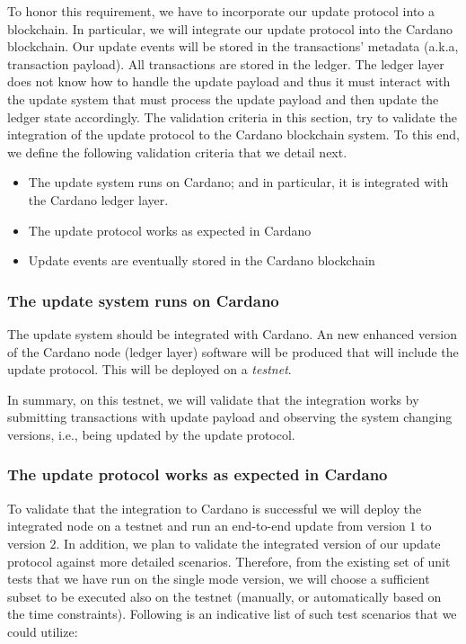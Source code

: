 To honor this requirement, we have to incorporate our update protocol into a
blockchain. In particular, we will integrate our update protocol into the
Cardano blockchain. Our update events will be stored in the transactions'
metadata (a.k.a, transaction payload). All transactions are stored in the
ledger. The ledger layer does not know how to handle the update payload and
thus it must interact with the update system that must process the update
payload and then update the ledger state accordingly. The validation criteria
in this section, try to validate the integration of the update protocol to the
Cardano blockchain system. To this end, we define the following validation
criteria that we detail next.
\begin{itemize}
	\item The update system runs on Cardano; and in particular, it is
	integrated
	with the Cardano ledger layer.
	\item The update protocol works as expected in Cardano
	\item Update events are eventually stored in the Cardano blockchain
\end{itemize}

\subsubsection{The update system runs on
	Cardano}\label{vc:The-update-system-runs-on-Cardano}
The update system should be integrated with Cardano. An new enhanced version of
the Cardano node (ledger layer) software will be produced that will include the
update protocol. This will be deployed on a \emph{testnet}.

In summary, on this testnet, we
will
validate that the integration works by submitting transactions with update
payload and observing the system changing versions, i.e., being updated by the
update protocol.

\subsubsection{The update protocol works as expected in Cardano}
\label{vc:The-update-protocol-works-as-expected-in-Cardano}
To validate that the integration to Cardano is successful we will
deploy the integrated node on a testnet and run an end-to-end update from 
version $1$ to version
$2$.
%
In addition, we plan to validate the integrated version of our update protocol 
against more
detailed scenarios. Therefore, from the existing set of unit tests that we have
run on the single mode version, we will choose a sufficient subset to be
executed also on the testnet (manually, or automatically based on the time
constraints). Following is an indicative list of such test scenarios that we
could utilize:

